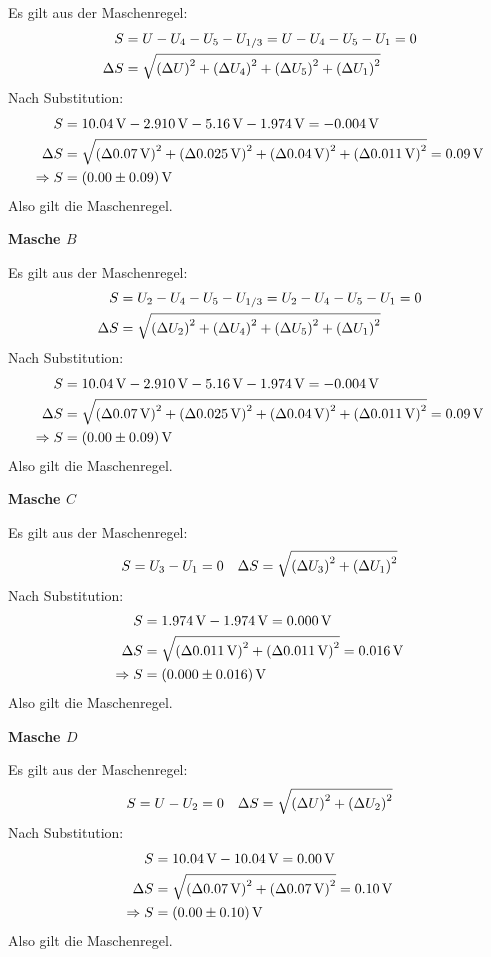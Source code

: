 	Es gilt aus der Maschenregel:
	\begin{align}
	 	S &= U - U_4 -U_5 - U_{1/3} = U - U_4 -U_5 - U_1 = 0\\ 
	 	\Delta S &= \addquad{U, U_4, U_5, U_1}
	\end{align} 
	Nach Substitution:
	\begin{align*}
		S &=  \SI{10.04}{\volt} - \SI{2.910}{\volt} - \SI{5.16}{\volt} - \SI{1.974}{\volt} = -\SI{0.004}{\volt}\\
		\Delta S &= \addquad{\SI{0.07}{\volt}, \SI{0.025}{\volt}, \SI{0.04}{\volt}, \SI{0.011}{\volt}} = \SI{0.09}{\volt} \\
		\Rightarrow S &= \SI{0.00(9)}{\volt} 
	\end{align*}
	Also gilt die Maschenregel.

	\textbf{Masche $B$}
	
	Es gilt aus der Maschenregel:
	\begin{align}
	 	S &= U_2 - U_4 -U_5 - U_{1/3} = U_2 - U_4 -U_5 - U_1 = 0 \\
	 	 \Delta S &= \addquad{U_2, U_4, U_5, U_1}
	\end{align} 
	Nach Substitution:
	\begin{align*}
		S &=  \SI{10.04}{\volt} - \SI{2.910}{\volt} - \SI{5.16}{\volt} - \SI{1.974}{\volt} = -\SI{0.004}{\volt}\\
		\Delta S &= \addquad{\SI{0.07}{\volt}, \SI{0.025}{\volt}, \SI{0.04}{\volt}, \SI{0.011}{\volt}} = \SI{0.09}{\volt} \\
		\Rightarrow S &= \SI{0.00(9)}{\volt} 
	\end{align*}
	Also gilt die Maschenregel.

	\textbf{Masche $C$}
	
	Es gilt aus der Maschenregel:
	\begin{align}
	 	S = U_3 - U_1 = 0 && \Delta S = \addquad{U_3, U_1}
	\end{align} 
	Nach Substitution:
	\begin{align*}
		S &=  \SI{1.974}{\volt} - \SI{1.974}{\volt} = \SI{0.000}{\volt}\\
		\Delta S &= \addquad{\SI{0.011}{\volt},\SI{0.011}{\volt}} = \SI{0.016}{\volt} \\
		\Rightarrow S &= \SI{0.000(16)}{\volt} 
	\end{align*}
	Also gilt die Maschenregel.

	\textbf{Masche $D$}
	
	Es gilt aus der Maschenregel:
	\begin{align}
	 	S = U - U_2 = 0 && \Delta S = \addquad{U, U_2}
	\end{align} 
	Nach Substitution:
	\begin{align*}
		S &=  \SI{10.04}{\volt} - \SI{10.04}{\volt} = \SI{0.00}{\volt}\\
		\Delta S &= \addquad{\SI{0.07}{\volt},\SI{0.07}{\volt}} = \SI{0.10}{\volt} \\
		\Rightarrow S &= \SI{0.00(10)}{\volt} 
	\end{align*}
	Also gilt die Maschenregel.
